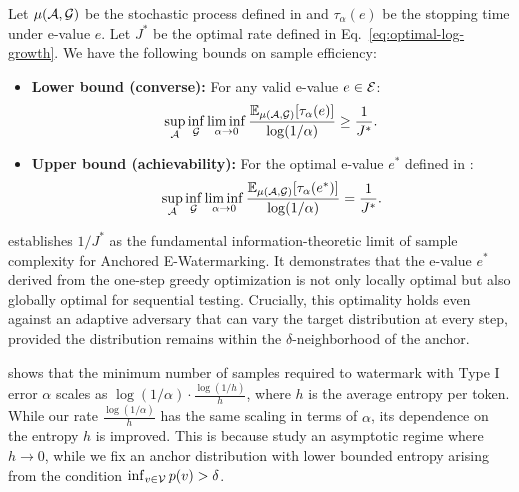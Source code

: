 \begin{theorem}
\label{thm:stopping-time}
Let $\mu(\mathcal{A},\mathcal{G})$ be the stochastic process defined in  and $\tau_\alpha(e)$ be the stopping time under e-value $e$. Let $J^*$ be the optimal rate defined in Eq.~\eqref{eq:optimal-log-growth}. We have the following bounds on sample efficiency:
\begin{itemize}
    \item \textbf{Lower bound (converse):} For any valid e-value $e \in \mathcal{E}$:
\begin{align*}
    \sup_{\mathcal{A}} \inf_{\mathcal{G}} \liminf_{\alpha \to 0} \frac{\mathbb{E}_{\mu(\mathcal{A},\mathcal{G})}[\tau_\alpha(e)]}{\log(1/\alpha)} \geq \frac{1}{J^*}.
\end{align*}
\item \textbf{Upper bound (achievability):} For the optimal e-value $e^*$ defined in :
\begin{align*}
    \sup_{\mathcal{A}} \inf_{\mathcal{G}} \liminf_{\alpha \to 0} \frac{\mathbb{E}_{\mu(\mathcal{A},\mathcal{G})}[\tau_\alpha(e^*)]}{\log(1/\alpha)} = \frac{1}{J^*}.
\end{align*}
\end{itemize}
\end{theorem}


 establishes $1/J^*$ as the fundamental information-theoretic limit of sample complexity for Anchored E-Watermarking. It demonstrates that the e-value $e^*$ derived from the one-step greedy optimization is not only locally optimal but also globally optimal for sequential testing. Crucially, this optimality holds even against an adaptive adversary that can vary the target distribution at every step, provided the distribution remains within the $\delta$-neighborhood of the anchor. 

\begin{remark}
\citet{huang2023towards} shows that the minimum number of samples required to watermark with Type I error $\alpha$ scales as $\log(1/\alpha)\cdot\frac{\log(1/h)}{h}$, where $h$ is the average entropy per token. While our rate $\frac{\log(1/\alpha)}{h}$ has the same scaling in terms of $\alpha$, its dependence on the entropy $h$ is improved. This is because \citet{huang2023towards} study an asymptotic regime where $h \to 0$, while we fix an anchor distribution with lower bounded entropy arising from the condition $\inf_{v \in \mathcal{V}}p(v) > \delta$.
\end{remark}